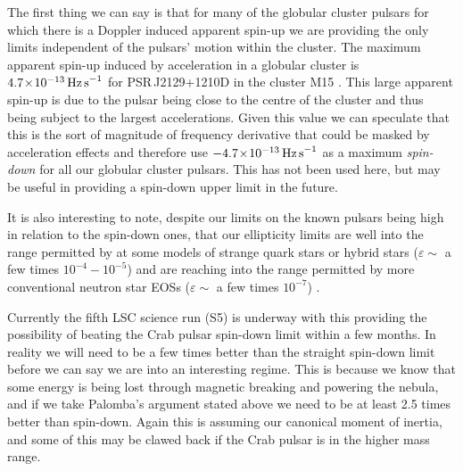 The first thing we can say is that for many of the globular cluster pulsars for which there is a
Doppler induced apparent spin-up we are providing the only limits independent of the pulsars' motion
within the cluster. The maximum apparent spin-up induced by acceleration in a globular cluster is
$4.7\!\times\!10^{-13}\,{\rm Hz\,s}^{-1}$ for PSR\,J2129+1210D in the cluster M15 \cite{Manchester:2005}. This
large apparent spin-up is due to the pulsar being close to the centre of the cluster and thus being
subject to the largest accelerations. Given this value we can speculate that this is the sort of
magnitude of frequency derivative that could be masked by acceleration effects and therefore use
$-4.7\!\times\!10^{-13}\,{\rm Hz\,s}^{-1}$ as a maximum {\it spin-down} for all our globular cluster pulsars.
This has not been used here, but may be useful in providing a spin-down upper limit in the future.

It is also interesting to note, despite our limits on the known pulsars being high in relation
to the spin-down ones, that our ellipticity limits are well into the range permitted by at some
models of strange quark stars or hybrid stars ($\varepsilon \sim$ a few times $10^{-4} - 10^{-5}$)
and are reaching into the range permitted by more conventional neutron star EOSs ($\varepsilon \sim$
a few times $10^{-7}$) \cite{Owen:2005}.

Currently the fifth LSC science run (S5) is underway with this providing the possibility of beating
the Crab pulsar spin-down limit within a few months. In reality we will need to be a few times
better than the straight spin-down limit before we can say we are into an interesting regime. This
is because we know that some energy is being lost through magnetic breaking and powering the nebula,
and if we take Palomba's argument stated above we need to be at least 2.5 times better than
spin-down. Again this is assuming our canonical moment of inertia, and some of this may be clawed
back if the Crab pulsar is in the higher mass range. 